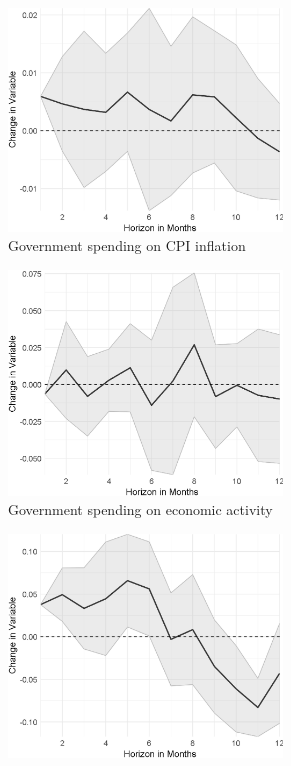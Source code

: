 \begin{figure}
\begin{subfigure}{00.24\textwidth}
	\includegraphics[width=0.8\textwidth]{output/lp/baseline/bHP/government_spending/government_spendingoninflation_djn.eps}
	\caption{Government spending on CPI inflation}
	\end{subfigure}
	\begin{subfigure}{00.24\textwidth}
		\includegraphics[width=0.8\textwidth]{output/lp/baseline/bHP/government_spending/government_spendingoneconac_djn.eps}
		\caption{Government spending on economic activity}
	\end{subfigure}
	\begin{subfigure}{00.24\textwidth}
		\includegraphics[width=0.8\textwidth]{output/lp/baseline/bHP/monetary_policy/monetary_policyonexpectations1y_djn.eps}

\end{subfigure}
\end{figure}
